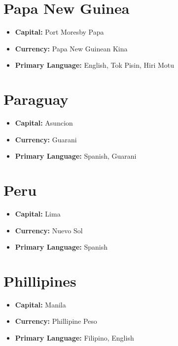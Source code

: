 \documentclass[a4paper,100pt,twoside]{book}
\begin{document}
\section*{\Huge Papa New Guinea}
\vspace{5mm} %
\begin{itemize}
	\item \textbf{Capital:} Port Moresby Papa
	\item \textbf{Currency:} Papa New Guinean Kina
	\item \textbf{Primary Language:} English, Tok Pisin, Hiri Motu
\end{itemize}

\section*{\Huge Paraguay}
\vspace{5mm} %
\begin{itemize}
	\item \textbf{Capital:} Asuncion
	\item \textbf{Currency:} Guarani
	\item \textbf{Primary Language:} Spanish, Guarani
\end{itemize}

\section*{\Huge Peru}
\vspace{5mm} %
\begin{itemize}
	\item \textbf{Capital:} Lima
	\item \textbf{Currency:} Nuevo Sol
	\item \textbf{Primary Language:} Spanish
\end{itemize}

\section*{\Huge Phillipines}
\vspace{5mm} %
\begin{itemize}
	\item \textbf{Capital:} Manila
	\item \textbf{Currency:} Phillipine Peso
	\item \textbf{Primary Language:} Filipino, English
\end{itemize}
\end{document}

